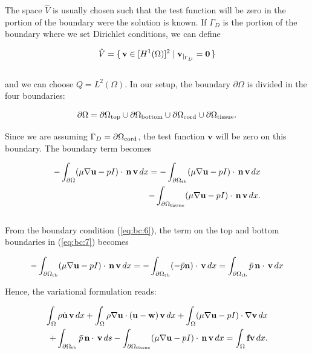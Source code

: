 \documentclass[11pt,a4paper,titlepage]{report}
\begin{document}
The space $\hat{V}$ is usually chosen such that the test function will be zero in the portion of the boundary were the solution is known. If $\Gamma_D$ is the portion of the boundary where we set Dirichlet conditions, we can define

\begin{equation}
\hat{V} = \set{\mathbf{v} \in [H^1(\Omega)]^2 | \mathbf{v}_{|_{\Gamma_D}} = \mathbf{0}} 
\end{equation}
\\
and we can choose $Q = L^2(\Omega)$. In our setup, the boundary $\partial \Omega$ is divided in the four boundaries:

\begin{equation}
\partial \Omega= \partial \Omega_{\rm top} \cup
\partial \Omega_{\rm bottom} \cup
\partial \Omega_{\rm cord} \cup
\partial \Omega_{\rm tissue}.
\end{equation}

Since we are assuming $\Gamma_D = \partial \Omega_{\rm cord}$, the test function $\mathbf{v}$ will be zero on this boundary. The boundary term becomes

\begin{equation}
\label{eq:bc:7}
\begin{split}
- \int_{\partial \Omega} (\mu \nabla \mathbf{u} - p I) \cdot \, \mathbf{n} \, \mathbf{v} \, dx =
-\int_{\partial \Omega_{\rm tb}} (\mu \nabla \mathbf{u} - p I) \cdot \, \mathbf{n} \, \mathbf{v} \, dx \\
- \int_{\partial \Omega_{\rm tissue}} (\mu \nabla \mathbf{u} - p I) \cdot \, \mathbf{n} \, \mathbf{v} \, dx.
\end{split}
\end{equation}
\\

From the boundary condition (\ref{eq:bc:6}), the term on the top and bottom boundaries in (\ref{eq:bc:7}) becomes

\begin{equation}
- \int_{\partial \Omega_{\rm tb}} (\mu \nabla \mathbf{u} - p I) \cdot \, \mathbf{n} \, \mathbf{v} \, dx = 
- \int_{\partial \Omega_{\rm tb}} (-\bar{p} \mathbf{n}) \cdot \, \mathbf{v} \, dx = 
\int_{\partial \Omega_{\rm tb}} \bar{p} \, \mathbf{n} \cdot \, \mathbf{v} \, dx
\end{equation}

Hence, the variational formulation reads:

\begin{equation}
\label{eq:ns:5}
\begin{split}
\int_{\Omega} \rho \dot{\mathbf{u}} \, \mathbf{v} \, dx
+ \int_{\Omega} \rho \nabla \mathbf{u} \cdot (\mathbf{u} - \mathbf{w}) \, \mathbf{v} \, dx
+ \int_{\Omega} (\mu \nabla \mathbf{u} - pI) \cdot \nabla \mathbf{v} \, dx \\
+ \int_{\partial \Omega_{\rm tb}} \bar{p} \, \mathbf{n} \cdot \, \mathbf{v} \, ds
- \int_{\partial \Omega_{\rm tissue}} (\mu \nabla \mathbf{u} - p I) \cdot \, \mathbf{n} \, \mathbf{v} \, dx
=  \int_{\Omega} \mathbf{f} \mathbf{v} \, dx.
\end{split}
\end{equation}
\end{document}
